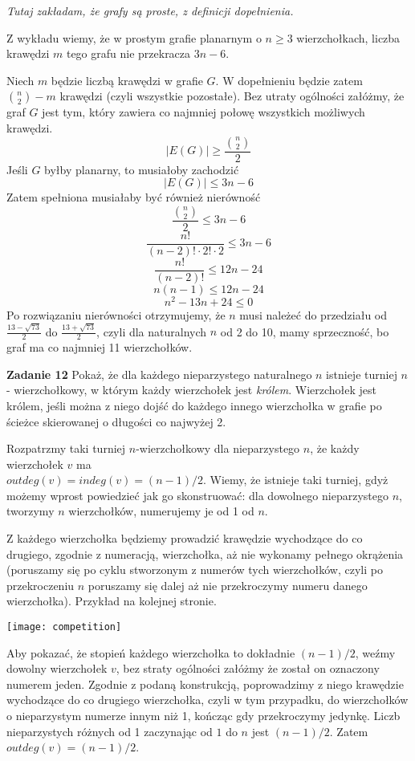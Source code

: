 \documentclass[12pt,a4paper]{article}
\begin{document}
\textit{Tutaj zakładam, że grafy są proste, z definicji dopełnienia.}
\vskip 0.2cm

Z wykładu wiemy, że w prostym grafie planarnym o \( n \geq 3 \) wierzchołkach, liczba krawędzi \(m\) tego grafu nie przekracza \(3n - 6\).

Niech \(m\) będzie liczbą krawędzi w grafie \(G\). W dopełnieniu będzie zatem \( {n\choose2} - m \) krawędzi (czyli wszystkie pozostałe). Bez utraty ogólności załóżmy, że graf \(G\) jest tym, który zawiera co najmniej połowę wszystkich możliwych krawędzi.
\[
	|E(G)| \geq  \frac{{n\choose2}}{2}
\]
Jeśli \(G\) byłby planarny, to musiałoby zachodzić
\[
	|E(G)| \leq  3n-6
\]
Zatem spełniona musiałaby być również nierówność
\[
	\frac{{n\choose2}}{2} \leq 3n-6
\]
\[
	\frac{n!}{(n-2)!\cdot2! \cdot 2} \leq 3n-6
\]
\[
	\frac{n!}{(n-2)!} \leq 12n-24
\]
\[
	n(n-1) \leq 12n-24
\]
\[
	n^2 - 13n + 24 \leq 0
\]
Po rozwiązaniu nierówności otrzymujemy, że \(n\) musi należeć do przedziału od \( \frac{13-\sqrt{73}}{2} \) do  \( \frac{13+\sqrt{73}}{2} \), czyli dla naturalnych \(n\) od 2 do 10, mamy sprzeczność, bo graf ma co najmniej 11 wierzchołków.

\vskip 1cm

\noindent
\textbf{Zadanie 12} Pokaż, że dla każdego nieparzystego naturalnego \(n\) istnieje turniej \(n\) - wierzchołkowy, w którym każdy wierzchołek jest \textit{królem}. Wierzchołek jest królem, jeśli można z niego dojść do każdego innego wierzchołka w grafie po ścieżce skierowanej o długości co najwyżej 2.
\vskip 0.2cm

Rozpatrzmy taki turniej \(n\)-wierzchołkowy dla nieparzystego \(n\), że każdy wierzchołek \(v\) ma\\ \(outdeg(v) = indeg(v) = (n-1)/2 \). Wiemy, że istnieje taki turniej, gdyż możemy wprost powiedzieć jak go skonstruować: dla dowolnego nieparzystego \(n\), tworzymy \(n\) wierzchołków, numerujemy je od 1 od \(n\).

Z każdego wierzchołka będziemy prowadzić krawędzie wychodzące do co drugiego, zgodnie z numeracją, wierzchołka, aż nie wykonamy pełnego okrążenia (poruszamy się po cyklu stworzonym z numerów tych wierzchołków, czyli po przekroczeniu \(n\) poruszamy się dalej aż nie przekroczymy numeru danego wierzchołka). Przykład na kolejnej stronie.

\begin{center}
	\texttt{[image: competition]}
\end{center}
Aby pokazać, że stopień każdego wierzchołka to dokładnie \( (n-1)/2 \), weźmy dowolny wierzchołek \(v\), bez straty ogólności załóżmy że został on oznaczony numerem jeden. Zgodnie z podaną konstrukcją, poprowadzimy z niego krawędzie wychodzące do co drugiego wierzchołka, czyli w tym przypadku, do wierzchołków o nieparzystym numerze innym niż 1, kończąc gdy przekroczymy jedynkę. Liczb nieparzystych różnych od 1 zaczynając od \(1\) do \( n\) jest \( (n-1)/2 \). Zatem \( outdeg(v) =  (n-1)/2 \).
\end{document}
